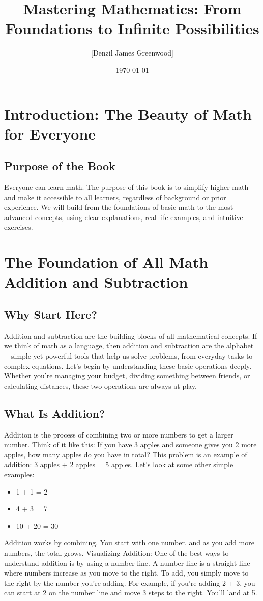 \documentclass{book}
\begin{document}
\title{Mastering Mathematics: From Foundations to Infinite Possibilities}
\author{[Denzil James Greenwood]}
\date{\today}
\maketitle

\tableofcontents

\chapter{Introduction: The Beauty of Math for Everyone}
\section{Purpose of the Book}
Everyone can learn math. The purpose of this book is to simplify higher math and make it accessible to all learners, regardless of background or prior experience.
We will build from the foundations of basic math to the most advanced concepts, using clear explanations, real-life examples, and intuitive exercises.
\chapter{The Foundation of All Math – Addition and Subtraction}
\section{Why Start Here?}
Addition and subtraction are the building blocks of all mathematical concepts. If we think of math as a language, then addition and subtraction are the alphabet—simple yet powerful tools that help us solve problems, from everyday tasks to complex equations.
Let’s begin by understanding these basic operations deeply. Whether you’re managing your budget, dividing something between friends, or calculating distances, these two operations are always at play.

\section{What Is Addition?}
Addition is the process of combining two or more numbers to get a larger number. Think of it like this:
If you have 3 apples and someone gives you 2 more apples, how many apples do you have in total?
This problem is an example of addition: 3 apples + 2 apples = 5 apples.
Let’s look at some other simple examples:
\begin{itemize}
	\item 1 + 1 = 2
	\item 4 + 3 = 7
	\item 10 + 20 = 30
\end{itemize}
Addition works by combining. You start with one number, and as you add more numbers, the total grows.
Visualizing Addition: One of the best ways to understand addition is by using a number line. A number line is a straight line where numbers increase as you move to the right. To add, you simply move to the right by the number you're adding.
For example, if you’re adding 2 + 3, you can start at 2 on the number line and move 3 steps to the right. You’ll land at 5.
\end{document}

